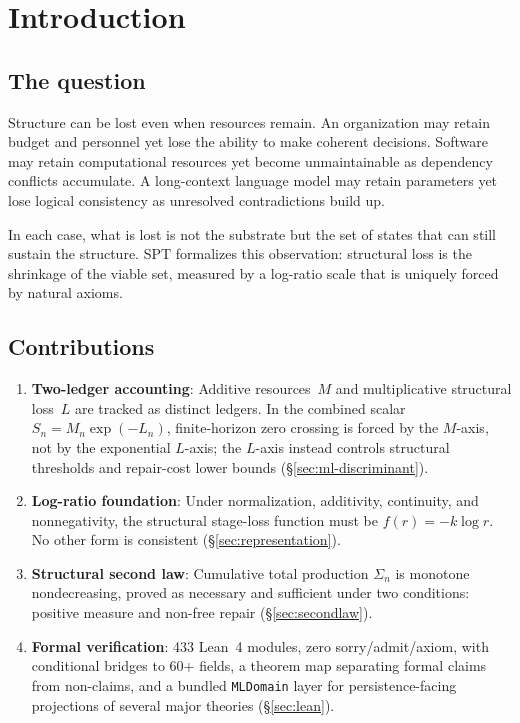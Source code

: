 \documentclass[11pt,a4paper]{article}
\begin{document}
\section{Introduction}

\subsection{The question}

Structure can be lost even when resources remain. An organization may retain budget and personnel yet lose the ability to make coherent decisions. Software may retain computational resources yet become unmaintainable as dependency conflicts accumulate. A long-context language model may retain parameters yet lose logical consistency as unresolved contradictions build up.

In each case, what is lost is not the substrate but the set of states that can still sustain the structure. SPT formalizes this observation: structural loss is the shrinkage of the viable set, measured by a log-ratio scale that is uniquely forced by natural axioms.

\subsection{Contributions}

\begin{enumerate}
\item \textbf{Two-ledger accounting}: Additive resources~$M$ and multiplicative structural loss~$L$ are tracked as distinct ledgers. In the combined scalar $S_n=M_n\exp(-L_n)$, finite-horizon zero crossing is forced by the $M$-axis, not by the exponential $L$-axis; the $L$-axis instead controls structural thresholds and repair-cost lower bounds (\S\ref{sec:ml-discriminant}).

\item \textbf{Log-ratio foundation}: Under normalization, additivity, continuity, and nonnegativity, the structural stage-loss function must be $f(r) = -k\log r$. No other form is consistent (\S\ref{sec:representation}).

\item \textbf{Structural second law}: Cumulative total production $\Sigma_n$ is monotone nondecreasing, proved as necessary and sufficient under two conditions: positive measure and non-free repair (\S\ref{sec:secondlaw}).

\item \textbf{Formal verification}: 433 Lean~4 modules, zero sorry/admit/axiom, with conditional bridges to 60+ fields, a theorem map separating formal claims from non-claims, and a bundled \texttt{MLDomain} layer for persistence-facing projections of several major theories (\S\ref{sec:lean}).
\end{enumerate}
\end{document}
